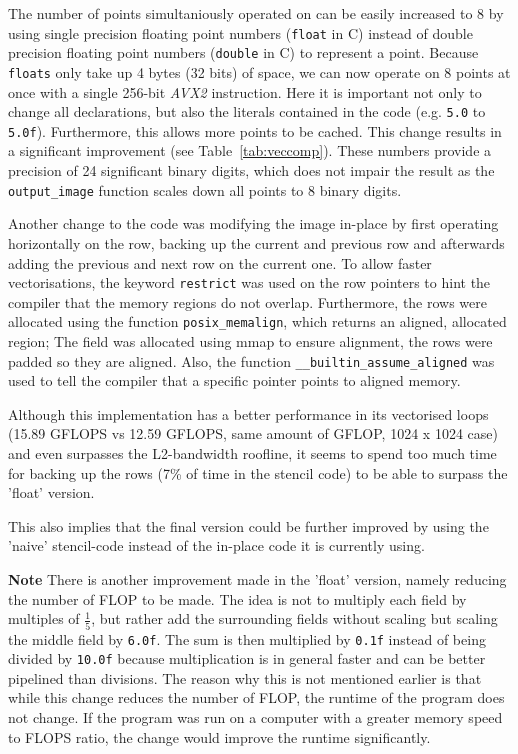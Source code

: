 \documentclass[letterpaper,twocolumn,10pt]{article}
\begin{document}
The number of points simultaniously operated on can be easily increased to 8 by using single precision
floating point numbers (\texttt{float} in C)
instead of double precision floating point numbers (\texttt{double} in C) to represent a point.
Because \texttt{floats} only take up 4 bytes (32 bits) of space, we can now operate on 8 points
at once with a single 256-bit \textit{AVX2} instruction. Here it is important not only to change
all declarations, but also the literals contained in the code (e.g. \texttt{5.0} to \texttt{5.0f}).
Furthermore, this allows more points to be cached.
This change results in a significant improvement (see Table~\ref{tab:veccomp}).
These numbers provide a precision of 24 significant binary digits, which does not impair
the result as the \texttt{output\_image} function scales down all points to 8 binary digits.


Another change to the code was modifying the image in-place by first operating horizontally on the row,
backing up the current and previous row and afterwards adding the previous and next row on 
the current one. To allow faster vectorisations, the keyword \texttt{restrict} was used
on the row pointers to hint the compiler that the memory regions do not overlap. 
Furthermore, the rows were allocated using the function \texttt{posix\_memalign}, which
returns an aligned, allocated region; The field was allocated using mmap to ensure alignment,
the rows were padded so they are aligned. Also, the function \texttt{\_\_builtin\_assume\_aligned}
was used to tell the compiler that a specific pointer points to aligned memory.

Although this implementation has a better performance in its vectorised loops (15.89 GFLOPS vs 12.59 GFLOPS, same amount of GFLOP, 1024 x 1024 case) and even surpasses the L2-bandwidth roofline,
it seems to spend too much time for backing up the rows (7\% of time in the stencil code) to be able to surpass the 'float' version. 

This also implies that the final version could be further improved by using the 'naive'
stencil-code instead of the in-place code it is currently using.

\textbf{Note} There is another improvement made in the 'float' version, namely reducing
the number of FLOP to be made. The idea is not to multiply each field by multiples of $\frac{1}{5}$,
but rather add the surrounding fields without scaling but scaling the middle field by \texttt{6.0f}.
The sum is then multiplied by \texttt{0.1f} instead of being divided by \texttt{10.0f} because
multiplication is in general faster and can be better pipelined than divisions.
The reason why this is not mentioned earlier is that while this change reduces the number of FLOP,
the runtime of the program does not change. If the program was run on a computer with a greater memory
speed to FLOPS ratio, the change would improve the runtime significantly.
\end{document}
